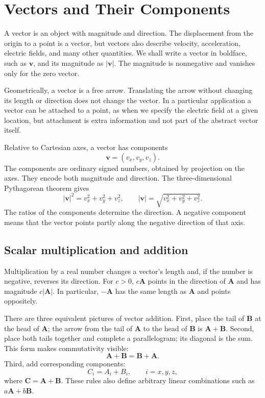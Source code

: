 \section{Vectors and Their Components}

A vector is an object with magnitude and direction.  The displacement from
the origin to a point is a vector, but vectors also describe velocity,
acceleration, electric fields, and many other quantities.  We shall write a
vector in boldface, such as \(\mathbf v\), and its magnitude as
\(\lvert\mathbf v\rvert\).  The magnitude is nonnegative and vanishes only for
the zero vector.

Geometrically, a vector is a free arrow.  Translating the arrow without
changing its length or direction does not change the vector.  In a particular
application a vector can be attached to a point, as when we specify the
electric field at a given location, but attachment is extra information and
not part of the abstract vector itself.

Relative to Cartesian axes, a vector has components
\begin{equation}
  \mathbf v=(v_x,v_y,v_z).
\end{equation}
The components are ordinary signed numbers, obtained by projection on the
axes.  They encode both magnitude and direction.  The three-dimensional
Pythagorean theorem gives
\begin{equation}
  \lvert\mathbf v\rvert^2
  =v_x^2+v_y^2+v_z^2,
  \qquad
  \lvert\mathbf v\rvert
  =\sqrt{v_x^2+v_y^2+v_z^2}.
  \label{eq:vector-magnitude}
\end{equation}
The ratios of the components determine the direction.  A negative component
means that the vector points partly along the negative direction of that
axis.

\subsection{Scalar multiplication and addition}

Multiplication by a real number changes a vector's length and, if the number
is negative, reverses its direction.  For \(c>0\), \(c\mathbf A\) points in
the direction of \(\mathbf A\) and has magnitude
\(c\lvert\mathbf A\rvert\).  In particular, \(-\mathbf A\) has the same
length as \(\mathbf A\) and points oppositely.

There are three equivalent pictures of vector addition.  First, place the
tail of \(\mathbf B\) at the head of \(\mathbf A\); the arrow from the tail of
\(\mathbf A\) to the head of \(\mathbf B\) is \(\mathbf A+\mathbf B\).
Second, place both tails together and complete a parallelogram; its diagonal
is the sum.  This form makes commutativity visible:
\begin{equation}
  \mathbf A+\mathbf B=\mathbf B+\mathbf A.
\end{equation}
Third, add corresponding components:
\begin{equation}
  C_i=A_i+B_i,
  \qquad i=x,y,z,
  \label{eq:component-addition}
\end{equation}
where \(\mathbf C=\mathbf A+\mathbf B\).  These rules also define arbitrary
linear combinations such as \(a\mathbf A+b\mathbf B\).

